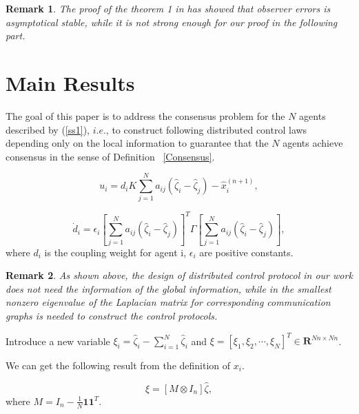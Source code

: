\documentclass[english]{cccconf}
\newtheorem{remark}{Remark}
\begin{document}
\begin{remark}
The proof of the theorem 1 in \cite{Zheng2008} has showed that observer errors is asymptotical stable, while it is not strong enough for our proof in the following part.
\end{remark}


    




\section{Main Results}

The goal of this paper is to address the consensus problem for the $N$ agents described by (\ref{ss1}), $i.e.$, to construct following distributed control laws depending only on the local information to guarantee that the $N$ agents achieve consensus in the sense of Definition ~\ref{Consensus}.

\begin{equation}
  \label{ui}
  u_i = d_i K \sum_{j=1}^N a_{ij} (\hat \zeta_i - \hat \zeta_j) - \hat x_i^{(n+1)},
\end{equation}
 
\begin{equation}
  \label{di}
  \dot d_i = \epsilon_i \left[\sum_{j=1}^N a_{ij} (\hat \zeta_i - \hat \zeta_j)\right]^T\Gamma\left[\sum_{j=1}^N a_{i j} (\hat \zeta_i - \hat \zeta_j)\right],
\end{equation}where $d_i$ is the coupling weight for agent i, $\epsilon_i$ are positive constants.

\begin{remark}
As shown above, the design of distributed control protocol in our work does not need the information of the global information, while in \cite{XiangyuWangTAC2017,DongCCC2017,Qin2014} the smallest nonzero eigenvalue of the Laplacian matrix for corresponding communication graphs is needed to construct the control protocols. 
\end{remark}

Introduce a new variable $\xi_i = \hat \zeta_i - \sum_{i = 1}^N \hat \zeta_i$ and $\xi = [\xi_1, \xi_2, \cdots, \xi_N]^T \in \mathbf R^{Nn \times Nn}$.

We can get the following result from the definition of $x_i$.

\begin{equation}\label{xi_definition}
\xi = [M \otimes I_n] \hat \zeta,
\end{equation} where $M=I_n - \frac{1}{N} \mathbf 1 \mathbf 1^T$. 
\end{document}
